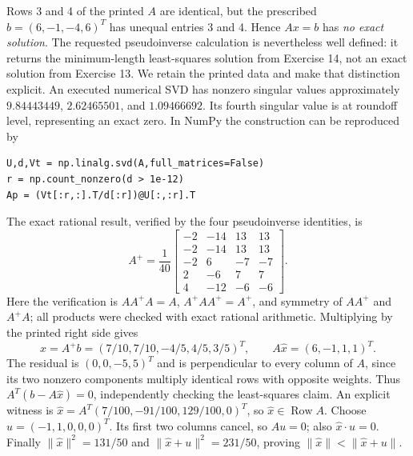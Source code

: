 Rows 3 and 4 of the printed $A$ are identical, but the prescribed
$b=(6,-1,-4,6)^T$ has unequal entries 3 and 4.
Hence $Ax=b$ has \emph{no exact solution}.
The requested pseudoinverse calculation is nevertheless well defined:
it returns the minimum-length least-squares solution from Exercise 14,
not an exact solution from Exercise 13. We retain the printed data and make
that distinction explicit.
An executed numerical SVD has nonzero singular values approximately
$9.84443449$, $2.62465501$, and $1.09466692$. Its fourth singular value
is at roundoff level, representing an exact zero.
In NumPy the construction can be reproduced by
\begin{verbatim}
U,d,Vt = np.linalg.svd(A,full_matrices=False)
r = np.count_nonzero(d > 1e-12)
Ap = (Vt[:r,:].T/d[:r])@U[:,:r].T
\end{verbatim}
The exact rational result, verified by the four pseudoinverse identities, is
\[
 A^+=\frac1{40}\begin{bmatrix}
 -2&-14&13&13\\-2&-14&13&13\\-2&6&-7&-7\\
 2&-6&7&7\\4&-12&-6&-6
 \end{bmatrix}.
\]
Here the verification is $AA^+A=A$, $A^+AA^+=A^+$, and symmetry
of $AA^+$ and $A^+A$; all products were checked with exact rational arithmetic.
Multiplying by the printed right side gives
\[
 \widehat x=A^+b=(7/10,7/10,-4/5,4/5,3/5)^T,
 \qquad A\widehat x=(6,-1,1,1)^T.
\]
The residual is $(0,0,-5,5)^T$ and is perpendicular to every column of
$A$, since its two nonzero components multiply identical rows with opposite
weights. Thus $A^T(b-A\widehat x)=0$, independently checking the least-squares claim.
An explicit witness is
$\widehat x=A^T(7/100,-91/100,129/100,0)^T$,
so $\widehat x\in\operatorname{Row}A$.
Choose $u=(-1,1,0,0,0)^T$. Its first two columns cancel, so $Au=0$;
also $\widehat x\cdot u=0$.
Finally $\|\widehat x\|^2=131/50$ and
$\|\widehat x+u\|^2=231/50$, proving
$\|\widehat x\|<\|\widehat x+u\|$.


